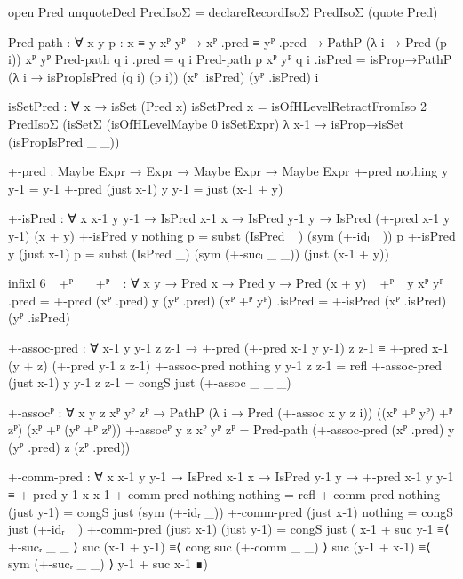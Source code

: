 \begin{code}[hide]
  open Pred
  unquoteDecl PredIsoΣ = declareRecordIsoΣ PredIsoΣ (quote Pred)

  Pred-path :
    ∀ {x y} {p : x ≡ y} {xᴾ yᴾ} →
    xᴾ .pred ≡ yᴾ .pred → PathP (λ i → Pred (p i)) xᴾ yᴾ
  Pred-path q i .pred = q i
  Pred-path {p} {xᴾ} {yᴾ} q i .isPred =
    isProp→PathP (λ i → isPropIsPred (q i) (p i)) (xᴾ .isPred) (yᴾ .isPred) i

  isSetPred : ∀ x → isSet (Pred x)
  isSetPred x =
    isOfHLevelRetractFromIso 2 PredIsoΣ
      (isSetΣ (isOfHLevelMaybe 0 isSetExpr) λ x-1 →
        isProp→isSet (isPropIsPred _ _))

  +-pred : Maybe Expr → Expr → Maybe Expr → Maybe Expr
  +-pred nothing y y-1 = y-1
  +-pred (just x-1) y y-1 = just (x-1 + y)

  +-isPred :
    ∀ {x x-1 y y-1} →
    IsPred x-1 x → IsPred y-1 y → IsPred (+-pred x-1 y y-1) (x + y)
  +-isPred {y} nothing p = subst (IsPred _) (sym (+-idₗ _)) p
  +-isPred {y} (just x-1) p =
    subst (IsPred _) (sym (+-sucₗ _ _)) (just (x-1 + y))

  infixl 6 _+ᴾ_
  _+ᴾ_ : ∀ {x y} → Pred x → Pred y → Pred (x + y)
  _+ᴾ_ {y} xᴾ yᴾ .pred = +-pred (xᴾ .pred) y (yᴾ .pred)
  (xᴾ +ᴾ yᴾ) .isPred = +-isPred (xᴾ .isPred) (yᴾ .isPred)

  +-assoc-pred :
    ∀ x-1 y y-1 z z-1 →
    +-pred (+-pred x-1 y y-1) z z-1 ≡ +-pred x-1 (y + z) (+-pred y-1 z z-1)
  +-assoc-pred nothing y y-1 z z-1 = refl
  +-assoc-pred (just x-1) y y-1 z z-1 = congS just (+-assoc _ _ _)

  +-assocᴾ :
    ∀ {x y z} xᴾ yᴾ zᴾ →
    PathP (λ i → Pred (+-assoc x y z i)) ((xᴾ +ᴾ yᴾ) +ᴾ zᴾ) (xᴾ +ᴾ (yᴾ +ᴾ zᴾ))
  +-assocᴾ {y} {z} xᴾ yᴾ zᴾ =
    Pred-path (+-assoc-pred (xᴾ .pred) y (yᴾ .pred) z (zᴾ .pred))
\end{code}
\begin{code}
  +-comm-pred :
    ∀ {x x-1 y y-1} → IsPred x-1 x → IsPred y-1 y →
    +-pred x-1 y y-1 ≡ +-pred y-1 x x-1
  +-comm-pred nothing nothing = refl
  +-comm-pred nothing (just y-1) = congS just (sym (+-idᵣ _))
  +-comm-pred (just x-1) nothing = congS just (+-idᵣ _)
  +-comm-pred (just x-1) (just y-1) =
    congS just
      ( x-1 + suc y-1   ≡⟨ +-sucᵣ _ _ ⟩
        suc (x-1 + y-1) ≡⟨ cong suc (+-comm _ _) ⟩
        suc (y-1 + x-1) ≡⟨ sym (+-sucᵣ _ _) ⟩
        y-1 + suc x-1   ∎)
\end{code}
